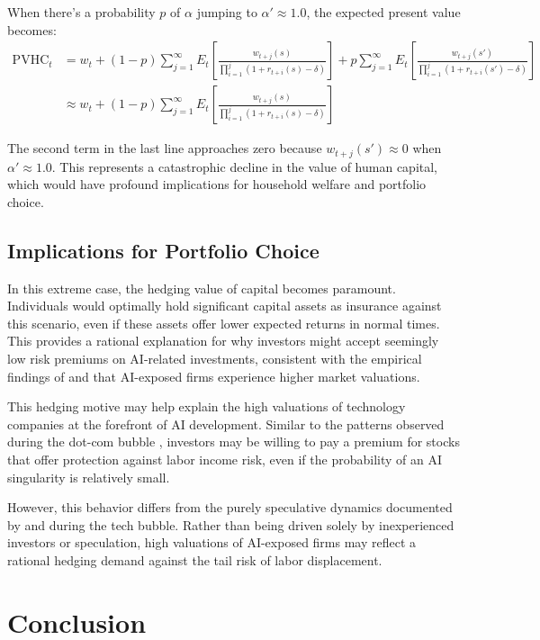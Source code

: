 \documentclass{article}
\theoremstyle{plain}    %
\theoremstyle{definition}  %
\begin{document}
When there's a probability $p$ of $\alpha$ jumping to $\alpha' \approx 1.0$, the expected present value becomes:
\begin{align}
\text{PVHC}_t &= w_t + (1-p)\sum_{j=1}^{\infty}E_t\left[\frac{w_{t+j}(s)}{\prod_{i=1}^{j}(1+r_{t+i}(s)-\delta)}\right] + p\sum_{j=1}^{\infty}E_t\left[\frac{w_{t+j}(s')}{\prod_{i=1}^{j}(1+r_{t+i}(s')-\delta)}\right]\\
&\approx w_t + (1-p)\sum_{j=1}^{\infty}E_t\left[\frac{w_{t+j}(s)}{\prod_{i=1}^{j}(1+r_{t+i}(s)-\delta)}\right]
\end{align}

The second term in the last line approaches zero because $w_{t+j}(s') \approx 0$ when $\alpha' \approx 1.0$. This represents a catastrophic decline in the value of human capital, which would have profound implications for household welfare and portfolio choice.

\subsection{Implications for Portfolio Choice}

In this extreme case, the hedging value of capital becomes paramount. Individuals would optimally hold significant capital assets as insurance against this scenario, even if these assets offer lower expected returns in normal times. This provides a rational explanation for why investors might accept seemingly low risk premiums on AI-related investments, consistent with the empirical findings of \citet{babina2024} and \citet{eisfeldt2023} that AI-exposed firms experience higher market valuations.

This hedging motive may help explain the high valuations of technology companies at the forefront of AI development. Similar to the patterns observed during the dot-com bubble \citep{ofek2003, hong2006}, investors may be willing to pay a premium for stocks that offer protection against labor income risk, even if the probability of an AI singularity is relatively small.

However, this behavior differs from the purely speculative dynamics documented by \citet{greenwood2009} and \citet{griffin2011} during the tech bubble. Rather than being driven solely by inexperienced investors or speculation, high valuations of AI-exposed firms may reflect a rational hedging demand against the tail risk of labor displacement.

\section{Conclusion}
\end{document}

